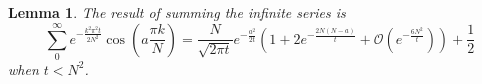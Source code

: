 \documentclass{article}
\newtheorem{lemma}{Lemma}
\begin{document}
\begin{lemma}
\label{lemma: integral reminder}
The result of summing the infinite series is
    \begin{equation}
        \sum_0^\infty e^{-\frac{k^2\pi^2 t}{2N^2}} \cos(a\frac{\pi k}{N}) = \frac{N}{\sqrt{2\pi t}} e^{-\frac{a^2}{2t}}\left( 1+ 2e^{-\frac{2N(N-a)}{t}} + \mathcal{O}(e^{-\frac{6N^2}{t}})\right)+\frac{1}{2}
    \end{equation}
    when $t<N^2$.
\end{lemma}
\end{document}
